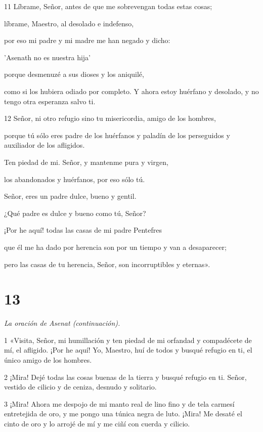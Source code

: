 \par 11 Líbrame, Señor, antes de que me sobrevengan todas estas cosas;
\par líbrame, Maestro, al desolado e indefenso,
\par por eso mi padre y mi madre me han negado y dicho:
\par 'Asenath no es nuestra hija'
\par porque desmenuzé a sus dioses y los aniquilé,
\par como si los hubiera odiado por completo. Y ahora estoy huérfano y desolado, y no tengo otra esperanza salvo ti.

\par 12 Señor, ni otro refugio sino tu misericordia, amigo de los hombres,
\par porque tú sólo eres padre de los huérfanos y paladín de los perseguidos y auxiliador de los afligidos.
\par Ten piedad de mi. Señor, y mantenme pura y virgen,
\par los abandonados y huérfanos, por eso sólo tú.
\par Señor, eres un padre dulce, bueno y gentil.
\par ¿Qué padre es dulce y bueno como tú, Señor?
\par ¡Por he aquí! todas las casas de mi padre Pentefres
\par que él me ha dado por herencia son por un tiempo y van a desaparecer;
\par pero las casas de tu herencia, Señor, son incorruptibles y eternas».

\chapter{13}

\par \textit{La oración de Asenat (continuación).}

\par 1 «Visita, Señor, mi humillación y ten piedad de mi orfandad y compadécete de mí, el afligido. ¡Por he aquí! Yo, Maestro, huí de todos y busqué refugio en ti, el único amigo de los hombres.

\par 2 ¡Mira! Dejé todas las cosas buenas de la tierra y busqué refugio en ti. Señor, vestido de cilicio y de ceniza, desnudo y solitario.

\par 3 ¡Mira! Ahora me despojo de mi manto real de lino fino y de tela carmesí entretejida de oro, y me pongo una túnica negra de luto. ¡Mira! Me desaté el cinto de oro y lo arrojé de mí y me ciñí con cuerda y cilicio.

